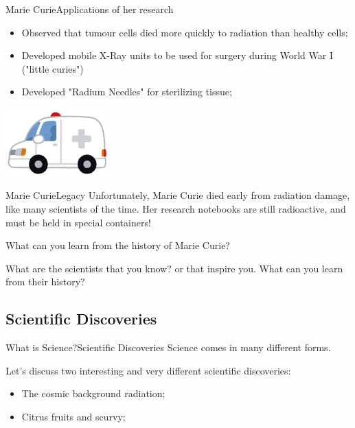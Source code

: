 \begin{frame}{Marie Curie}{Applications of her research}
  \begin{itemize}
    \item Observed that tumour cells died more quickly to radiation than healthy cells;
    \medskip

    \item Developed mobile X-Ray units to be used for surgery during World War I ("little curies")
    \medskip

    \item Developed "Radium Needles" for sterilizing tissue;
  \end{itemize}
  \hfill\includegraphics[width=0.3\textwidth]{../img/irasutoya_ambulance.png}
\end{frame}

\begin{frame}{Marie Curie}{Legacy}
  Unfortunately, Marie Curie died early from radiation damage, like many scientists of the time. Her research notebooks are still radioactive, and must be held in special containers!\vfill

  What can you learn from the history of Marie Curie?\bigskip

  What are the scientists that you know? or that inspire you. What can you learn from their history?
\end{frame}

\subsection{Scientific Discoveries}
\begin{frame}{What is Science?}{Scientific Discoveries}
  Science comes in many different forms.\vfill

  Let's discuss two interesting and very different scientific discoveries:
  \begin{itemize}
    \item The cosmic background radiation;
    \item Citrus fruits and scurvy;
  \end{itemize}
\end{frame}

